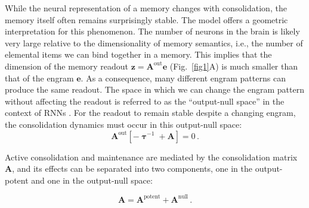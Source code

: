 While the neural representation of a memory changes with consolidation, the memory itself often remains surprisingly stable. The model offers a geometric interpretation for this phenomenon. The number of neurons in the brain is likely very large relative to the dimensionality of memory semantics, i.e., the number of elemental items we can bind together in a memory. This implies that the dimension of the memory readout $\mathbf{z}= \mathbf{A}^{\text{out}} \mathbf{e}$ (Fig.~\ref{fig1}A) is much smaller than that of the engram $\mathbf{e}$. As a consequence, many different engram patterns can produce the same readout. The space in which we can change the engram pattern without affecting the readout is referred to as the ``output-null space'' in the context of RNNs \citep{Kaufman2014}. %
%
For the readout to remain stable despite a changing engram, the consolidation dynamics must occur in this output-null space:
\begin{equation*}
    \mathbf{A}^\text{out} \left[ - \boldsymbol{\uptau}^{-1} + \mathbf{A}\right] = 0 \,.
\end{equation*}

Active consolidation and maintenance are mediated by the consolidation matrix $\mathbf{A}$, and its effects can be separated into two components, one in the output-potent and one in the output-null space:

\begin{equation}\label{eq:output_decomp}
\mathbf{A} = \mathbf{A}^{\text{potent}} + \mathbf{A}^{\text{null}} \,.
\end{equation}


